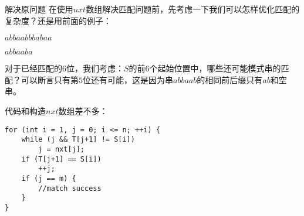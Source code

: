 \documentclass{beamer}
\theoremstyle{compact}
\begin{document}
\begin{frame}[fragile]{解决原问题}
	在使用$nxt$数组解决匹配问题前，先考虑一下我们可以怎样优化匹配的复杂度？还是用前面的例子：
	
	{\color{red} $abbaab$}$bbabaa$
	
	{\color{blue} $abbaab$}$a$
	
	\pause
	
	对于已经匹配的$6$位，我们考虑：$S$的前$6$个起始位置中，哪些还可能模式串的匹配？可以断言只有第$5$位还有可能，这是因为串$abbaab$的相同前后缀只有$ab$和空串。
	\pause
	
	代码和构造$nxt$数组差不多：
	
	\begin{verbatim}
for (int i = 1, j = 0; i <= n; ++i) {
    while (j && T[j+1] != S[i])
        j = nxt[j];
    if (T[j+1] == S[i])
        ++j;
    if (j == m) {
        //match success
    }
}
	\end{verbatim}
	
\end{frame}
\end{document}
